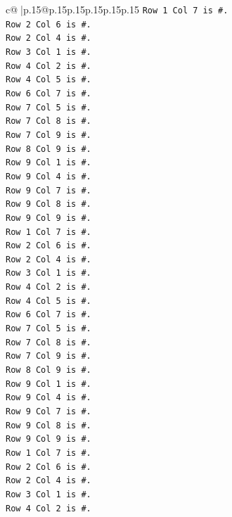 \documentclass{article}
\begin{document}
{\begin{supertabular}{c@{$\;$}|p{.15\linewidth}@{}p{.15\linewidth}p{.15\linewidth}p{.15\linewidth}p{.15\linewidth}p{.15\linewidth}}
{{{\texttt{Row 1 Col 7 is \#.} \\
\texttt{Row 2 Col 6 is \#.} \\
\texttt{Row 2 Col 4 is \#.} \\
\texttt{Row 3 Col 1 is \#.} \\
\texttt{Row 4 Col 2 is \#.} \\
\texttt{Row 4 Col 5 is \#.} \\
\texttt{Row 6 Col 7 is \#.} \\
\texttt{Row 7 Col 5 is \#.} \\
\texttt{Row 7 Col 8 is \#.} \\
\texttt{Row 7 Col 9 is \#.} \\
\texttt{Row 8 Col 9 is \#.} \\
\texttt{Row 9 Col 1 is \#.} \\
\texttt{Row 9 Col 4 is \#.} \\
\texttt{Row 9 Col 7 is \#.} \\
\texttt{Row 9 Col 8 is \#.} \\
\texttt{Row 9 Col 9 is \#.} \\
\texttt{Row 1 Col 7 is \#.} \\
\texttt{Row 2 Col 6 is \#.} \\
\texttt{Row 2 Col 4 is \#.} \\
\texttt{Row 3 Col 1 is \#.} \\
\texttt{Row 4 Col 2 is \#.} \\
\texttt{Row 4 Col 5 is \#.} \\
\texttt{Row 6 Col 7 is \#.} \\
\texttt{Row 7 Col 5 is \#.} \\
\texttt{Row 7 Col 8 is \#.} \\
\texttt{Row 7 Col 9 is \#.} \\
\texttt{Row 8 Col 9 is \#.} \\
\texttt{Row 9 Col 1 is \#.} \\
\texttt{Row 9 Col 4 is \#.} \\
\texttt{Row 9 Col 7 is \#.} \\
\texttt{Row 9 Col 8 is \#.} \\
\texttt{Row 9 Col 9 is \#.} \\
\texttt{Row 1 Col 7 is \#.} \\
\texttt{Row 2 Col 6 is \#.} \\
\texttt{Row 2 Col 4 is \#.} \\
\texttt{Row 3 Col 1 is \#.} \\
\texttt{Row 4 Col 2 is \#.} \\
}}}
\end{supertabular}}
\end{document}
